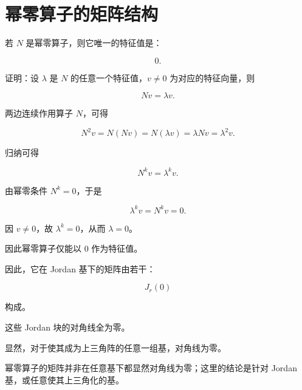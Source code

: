 \section{幂零算子的矩阵结构}

若 $N$ 是幂零算子，则它唯一的特征值是：

\[
0.
\]

证明：设 $\lambda$ 是 $N$ 的任意一个特征值，$v\neq 0$ 为对应的特征向量，则

\[
Nv=\lambda v.
\]

两边连续作用算子 $N$，可得

\[
N^2 v = N(Nv)=N(\lambda v)=\lambda Nv=\lambda^2 v.
\]

归纳可得

\[
N^k v=\lambda^k v.
\]

由幂零条件 $N^k=0$，于是

\[
\lambda^k v = N^k v = 0.
\]

因 $v\neq 0$，故 $\lambda^k=0$，从而 $\lambda=0$。

因此幂零算子仅能以 $0$ 作为特征值。

因此，它在 Jordan 基下的矩阵由若干：

\[
J_r(0)
\]

构成。

这些 Jordan 块的对角线全为零。

显然，对于使其成为上三角阵的任意一组基，对角线为零。

幂零算子的矩阵并非在任意基下都显然对角线为零；这里的结论是针对 Jordan 基，或任意使其上三角化的基。
